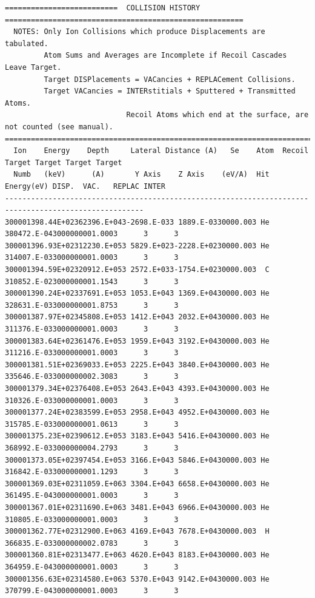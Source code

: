 \documentclass [11pt,a4paper,dvipdfmx] {jarticle}
\begin{document}
\begin{lstlisting}[caption={COLLISION.txtの例。1イベントのみ抽出。},basicstyle=\fontsize{6}{6}\ttfamily,identifierstyle=\fontsize{6}{6},numberstyle={\tiny},columns=fixed]
==========================  COLLISION HISTORY  =======================================================
  NOTES: Only Ion Collisions which produce Displacements are tabulated.                               
         Atom Sums and Averages are Incomplete if Recoil Cascades Leave Target.                       
         Target DISPlacements = VACancies + REPLACement Collisions.                                   
         Target VACancies = INTERstitials + Sputtered + Transmitted Atoms.                            
                            Recoil Atoms which end at the surface, are not counted (see manual).      
======================================================================================================
  Ion    Energy    Depth     Lateral Distance (A)   Se    Atom  Recoil    Target Target Target Target 
  Numb   (keV)      (A)       Y Axis    Z Axis    (eV/A)  Hit  Energy(eV) DISP.  VAC.   REPLAC INTER  
------------------------------------------------------------------------------------------------------
300001398.44E+02362396.E+043-2698.E-033 1889.E-0330000.003 He 380472.E-043000000001.0003      3      3
300001396.93E+02312230.E+053 5829.E+023-2228.E+0230000.003 He 314007.E-033000000001.0003      3      3
300001394.59E+02320912.E+053 2572.E+033-1754.E+0230000.003  C 310852.E-023000000001.1543      3      3
300001390.24E+02337691.E+053 1053.E+043 1369.E+0430000.003 He 328631.E-033000000001.8753      3      3
300001387.97E+02345808.E+053 1412.E+043 2032.E+0430000.003 He 311376.E-033000000001.0003      3      3
300001383.64E+02361476.E+053 1959.E+043 3192.E+0430000.003 He 311216.E-033000000001.0003      3      3
300001381.51E+02369033.E+053 2225.E+043 3840.E+0430000.003 He 335646.E-033000000002.3083      3      3
300001379.34E+02376408.E+053 2643.E+043 4393.E+0430000.003 He 310326.E-033000000001.0003      3      3
300001377.24E+02383599.E+053 2958.E+043 4952.E+0430000.003 He 315785.E-033000000001.0613      3      3
300001375.23E+02390612.E+053 3183.E+043 5416.E+0430000.003 He 368992.E-033000000004.2793      3      3
300001373.05E+02397454.E+053 3166.E+043 5846.E+0430000.003 He 316842.E-033000000001.1293      3      3
300001369.03E+02311059.E+063 3304.E+043 6658.E+0430000.003 He 361495.E-043000000001.0003      3      3
300001367.01E+02311690.E+063 3481.E+043 6966.E+0430000.003 He 310805.E-033000000001.0003      3      3
300001362.77E+02312900.E+063 4169.E+043 7678.E+0430000.003  H 366835.E-033000000002.0783      3      3
300001360.81E+02313477.E+063 4620.E+043 8183.E+0430000.003 He 364959.E-043000000001.0003      3      3
300001356.63E+02314580.E+063 5370.E+043 9142.E+0430000.003 He 370799.E-043000000001.0003      3      3

\end{lstlisting}
\end{document}
